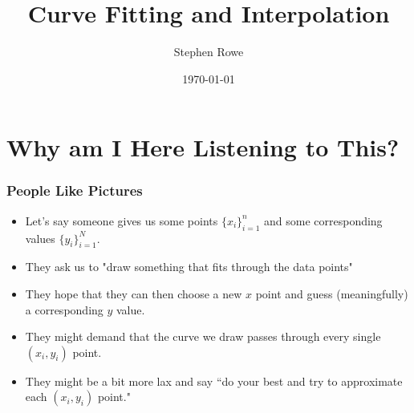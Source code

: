 \documentclass{beamer}
\title{Curve Fitting and Interpolation}
\author{Stephen Rowe}
\date{\today}
\begin{document}
 

\begin{frame}

\titlepage

\end{frame}
 


\section{Why am I Here Listening to This?}
\begin{frame}
\frametitle{People Like Pictures}
\begin{itemize}
\item Let's say someone gives us some points $\{x_i\}_{i=1}^n$ and some corresponding values $\{y_i\}_{i=1}^N$.
\item They ask us to "draw something that fits through the data points"
\item They hope that they can then choose a new $x$ point and guess (meaningfully) a corresponding $y$ value.
\item They might demand that the curve we draw passes through every single $(x_i,y_i)$ point.
\item They might be a bit more lax and say ``do your best and try to approximate each $(x_i,y_i)$ point."
\end{itemize}
\end{frame}
\end{document}
